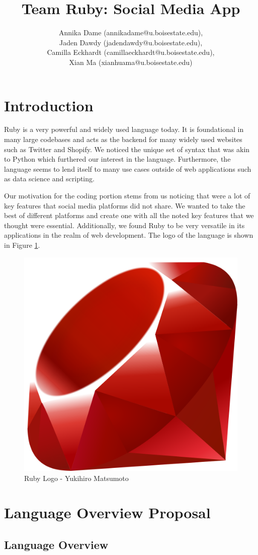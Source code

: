 \documentclass[a4paper,10pt]{article}
\title{Team Ruby: Social Media App}
\author {Annika Dame (annikadame@u.boisestate.edu), \\
Jaden Dawdy (jadendawdy@u.boisestate.edu), \\
Camilla Eckhardt (camillaeckhardt@u.boisestate.edu), \\
Xian Ma (xianhuama@u.boisestate.edu)}
\begin{document}
  \maketitle

  \section{Introduction}
  \label{sec:into}

  Ruby is a very powerful and widely used language today. It is foundational in many large codebases and acts as the backend for
  many widely used websites such as Twitter and Shopify. We noticed the unique set of syntax that was akin to Python which furthered our interest
  in the language. Furthermore, the language seems to lend itself to many use cases outside of web applications such as data science and scripting.

  Our motivation for the coding portion stems from us noticing that were a lot of key features that social media platforms
  did not share. We wanted to take the best of different platforms and create one with all the noted key features that we thought were essential.
  Additionally, we found Ruby to be very versatile in its applications in the realm of web development. The logo of the language is shown in Figure \ref{fig:ruby_logo}.

    \begin{figure}
  \centering
      \includegraphics[width=.25\columnwidth]{ruby_logo.png}
      \caption{Ruby Logo - Yukihiro Matsumoto}
      \label{fig:ruby_logo}
  \end{figure}


  \cite{RubyLogo}


  \section{Language Overview Proposal}
  \label{sec: overview_proposal}

  \subsection{Language Overview}
\end{document}
